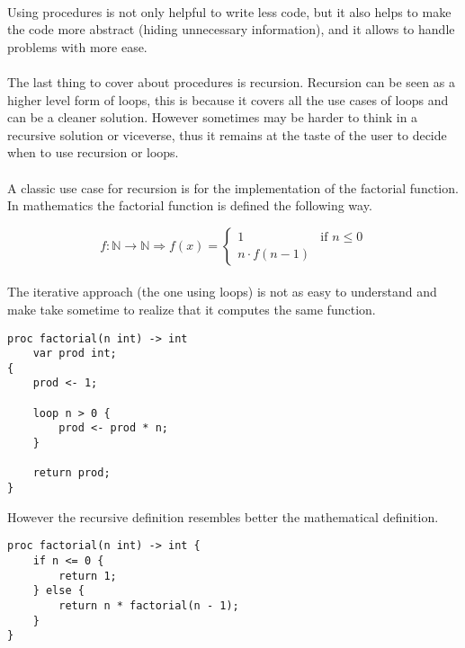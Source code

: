 \paragraph{} Using procedures is not only helpful to write less code, but it
also helps to make the code more abstract (hiding unnecessary information), and
it allows to handle problems with more ease.

\newpage

\paragraph{} The last thing to cover about procedures is recursion. Recursion
can be seen as a higher level form of loops, this is because it covers all the
use cases of loops and can be a cleaner solution. However sometimes may be
harder to think in a recursive solution or viceverse, thus it remains at the
taste of the user to decide when to use recursion or loops.

\paragraph{} A classic use case for recursion is for the implementation of the
factorial function. In mathematics the factorial function is defined the
following way.

\[
    f: \mathbb{N}\to\mathbb{N}
    \Rightarrow
    f(x) =
    \begin{cases}
        1                &\text{if } n \leq 0\\
        n \cdot f(n - 1)
    \end{cases}
\]

\paragraph{} The iterative approach (the one using loops) is not as easy to
understand and make take sometime to realize that it computes the same function.

\begin{verbatim}
proc factorial(n int) -> int
    var prod int;
{
    prod <- 1;
    
    loop n > 0 {
        prod <- prod * n;
    }

    return prod;
}
\end{verbatim}

\noindent
However the recursive definition resembles better the mathematical definition.

\begin{verbatim}
proc factorial(n int) -> int {
    if n <= 0 {
        return 1;
    } else {
        return n * factorial(n - 1);
    }
}
\end{verbatim}

